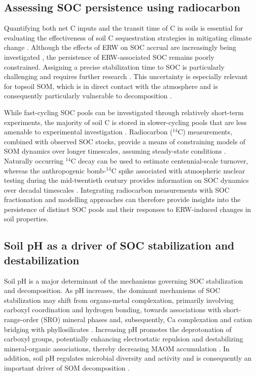 \documentclass[preprint,12pt]{elsarticle}
\begin{document}
\subsection{Assessing SOC persistence using radiocarbon}

Quantifying both net C inputs and the transit time of C in soils is essential for evaluating the effectiveness of soil C sequestration strategies in mitigating climate change \citep{sierra2021climate,xia2013traceable}. Although the effects of ERW on SOC accrual are increasingly being investigated \citep{Boito2025,steinwidder2025beyond}, the persistence of ERW-associated SOC remains poorly constrained. Assigning a precise stabilization time to SOC is particularly challenging and requires further research \citep{manning2024soil}. This uncertainty is especially relevant for topsoil SOM, which is in direct contact with the atmosphere and is consequently particularly vulnerable to decomposition \citep{mills2014longterm}.

While fast-cycling SOC pools can be investigated through relatively short-term experiments, the majority of soil C is stored in slower-cycling pools that are less amenable to experimental investigation \citep{mills2014longterm}. Radiocarbon ($^{14}$C) measurements, combined with observed SOC stocks, provide a means of constraining models of SOM dynamics over longer timescales, assuming steady-state conditions \citep{sierra2014radiocarbon}. Naturally occurring $^{14}$C decay can be used to estimate centennial-scale turnover, whereas the anthropogenic bomb-$^{14}$C spike associated with atmospheric nuclear testing during the mid-twentieth century provides information on SOC dynamics over decadal timescales \citep{mills2014longterm}. Integrating radiocarbon measurements with SOC fractionation and modelling approaches can therefore provide insights into the persistence of distinct SOC pools and their responses to ERW-induced changes in soil properties.

\subsection{Soil pH as a driver of SOC stabilization and destabilization}

Soil pH is a major determinant of the mechanisms governing SOC stabilization and decomposition. As pH increases, the dominant mechanisms of SOC stabilization may shift from organo-metal complexation, primarily involving carboxyl coordination and hydrogen bonding, towards associations with short-range-order (SRO) mineral phases and, subsequently, Ca complexation and cation bridging with phyllosilicates \citep{zhou2024global,Rasmussen2018,jiang2026molecular}. Increasing pH promotes the deprotonation of carboxyl groups, potentially enhancing electrostatic repulsion and destabilizing mineral-organic associations, thereby decreasing MAOM accumulation \citep{jiang2026molecular}. In addition, soil pH regulates microbial diversity and activity and is consequently an important driver of SOM decomposition \citep{Wang2024}.
\end{document}
